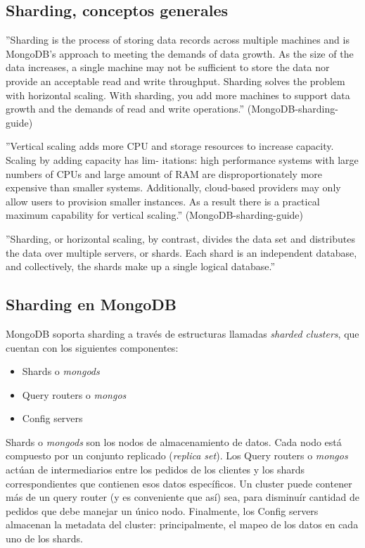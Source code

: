 \subsection{Sharding, conceptos generales}

''Sharding is the process of storing data records across multiple machines and is MongoDB’s approach to meeting the
demands of data growth. As the size of the data increases, a single machine may not be sufficient to store the data nor
provide an acceptable read and write throughput. Sharding solves the problem with horizontal scaling. With sharding,
you add more machines to support data growth and the demands of read and write operations.'' (MongoDB-sharding-guide)

''Vertical scaling adds more CPU and storage resources to increase capacity. Scaling by adding capacity has lim-
itations: high performance systems with large numbers of CPUs and large amount of RAM are disproportionately
more expensive than smaller systems. Additionally, cloud-based providers may only allow users to provision smaller
instances. As a result there is a practical maximum capability for vertical scaling.'' (MongoDB-sharding-guide)

''Sharding, or horizontal scaling, by contrast, divides the data set and distributes the data over multiple servers, or
shards. Each shard is an independent database, and collectively, the shards make up a single logical database.''

\subsection{Sharding en MongoDB}

MongoDB soporta sharding a través de estructuras llamadas \emph{sharded clusters},
que cuentan con los siguientes componentes:

\begin{itemize}
	\item Shards o \emph{mongods}
	\item Query routers o \emph{mongos}
	\item Config servers 
\end{itemize}

Shards o \emph{mongods} son los nodos de almacenamiento de datos. Cada nodo está compuesto por un 
conjunto replicado (\emph{replica set}). 
Los Query routers o \emph{mongos} actúan de intermediarios entre los pedidos de los clientes y los shards correspondientes
que contienen esos datos específicos. Un cluster puede contener más de un query router (y es conveniente que así) sea,
para disminuír cantidad de pedidos que debe manejar un único nodo.
Finalmente, los Config servers almacenan la metadata del cluster: principalmente, el mapeo de los datos en cada uno de los
shards.

